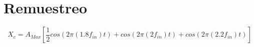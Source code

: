 \documentclass[../../ASSD_TP1_G7.tex]{subfiles}
\begin{document}
\chapter*{Remuestreo}





\begin{equation}
X_c=A_{Max}[\frac{1}{2}cos(2\pi (1.8 f_{in})t)+cos(2\pi (2 f_{in})t)+cos(2\pi (2.2 f_{in})t)]
\end{equation}\label{eq:inputSignlanAM}
\end{document}

